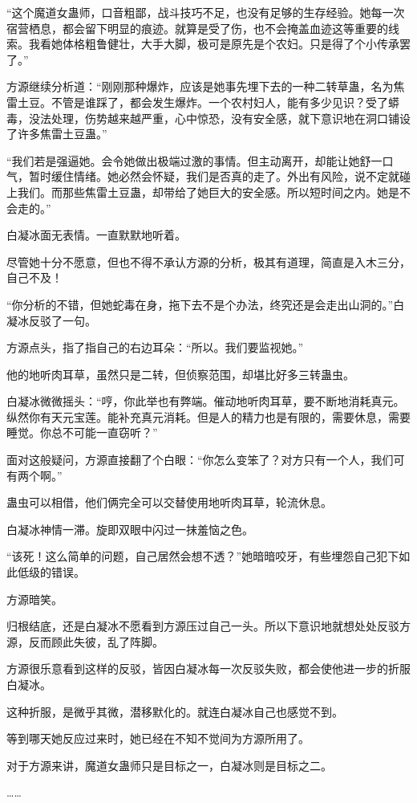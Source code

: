 \begin{this_body}
“这个魔道女蛊师，口音粗鄙，战斗技巧不足，也没有足够的生存经验。她每一次宿营栖息，都会留下明显的痕迹。就算是受了伤，也不会掩盖血迹这等重要的线索。我看她体格粗鲁健壮，大手大脚，极可是原先是个农妇。只是得了个小传承罢了。”

方源继续分析道：“刚刚那种爆炸，应该是她事先埋下去的一种二转草蛊，名为焦雷土豆。不管是谁踩了，都会发生爆炸。一个农村妇人，能有多少见识？受了蟒毒，没法处理，伤势越来越严重，心中惊恐，没有安全感，就下意识地在洞口铺设了许多焦雷土豆蛊。”

“我们若是强逼她。会令她做出极端过激的事情。但主动离开，却能让她舒一口气，暂时缓住情绪。她必然会怀疑，我们是否真的走了。外出有风险，说不定就碰上我们。而那些焦雷土豆蛊，却带给了她巨大的安全感。所以短时间之内。她是不会走的。”

白凝冰面无表情。一直默默地听着。

尽管她十分不愿意，但也不得不承认方源的分析，极其有道理，简直是入木三分，自己不及！

“你分析的不错，但她蛇毒在身，拖下去不是个办法，终究还是会走出山洞的。”白凝冰反驳了一句。

方源点头，指了指自己的右边耳朵：“所以。我们要监视她。”

他的地听肉耳草，虽然只是二转，但侦察范围，却堪比好多三转蛊虫。

白凝冰微微摇头：“哼，你此举也有弊端。催动地听肉耳草，要不断地消耗真元。纵然你有天元宝莲。能补充真元消耗。但是人的精力也是有限的，需要休息，需要睡觉。你总不可能一直窃听？”

面对这般疑问，方源直接翻了个白眼：“你怎么变笨了？对方只有一个人，我们可有两个啊。”

蛊虫可以相借，他们俩完全可以交替使用地听肉耳草，轮流休息。

白凝冰神情一滞。旋即双眼中闪过一抹羞恼之色。

“该死！这么简单的问题，自己居然会想不透？”她暗暗咬牙，有些埋怨自己犯下如此低级的错误。

方源暗笑。

归根结底，还是白凝冰不愿看到方源压过自己一头。所以下意识地就想处处反驳方源，反而顾此失彼，乱了阵脚。

方源很乐意看到这样的反驳，皆因白凝冰每一次反驳失败，都会使他进一步的折服白凝冰。

这种折服，是微乎其微，潜移默化的。就连白凝冰自己也感觉不到。

等到哪天她反应过来时，她已经在不知不觉间为方源所用了。

对于方源来讲，魔道女蛊师只是目标之一，白凝冰则是目标之二。

……


\end{this_body}
